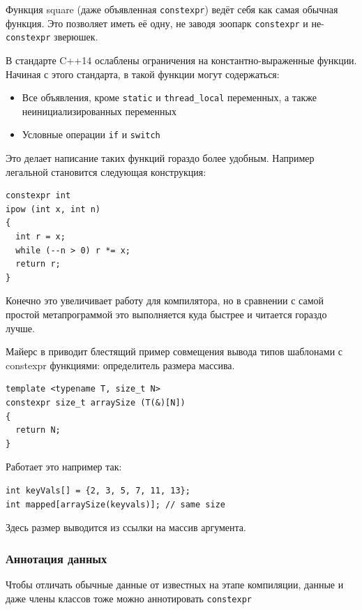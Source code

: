 \documentclass[a4paper,12pt,oneside]{article}
\begin{document}
Функция square (даже объявленная \lstinline!constexpr!) ведёт себя как самая обычная функция. Это позволяет иметь её одну, не заводя зоопарк \lstinline!constexpr! и не-\lstinline!constexpr! зверюшек.

В стандарте C++14 ослаблены ограничения на константно-выраженные функции. Начиная с этого стандарта, в такой функции могут содержаться:

\begin{itemize}
\item Все объявления, кроме \lstinline!static! и \lstinline!thread_local! переменных, а также неинициализированных переменных
\item Условные операции \lstinline!if! и \lstinline!switch!
\end{itemize}

Это делает написание таких функций гораздо более удобным. Например легальной становится следующая конструкция:

\begin{lstlisting}
constexpr int 
ipow (int x, int n) 
{ 
  int r = x;
  while (--n > 0) r *= x;
  return r;
}
\end{lstlisting}

Конечно это увеличивает работу для компилятора, но в сравнении с самой простой метапрограммой это выполняется куда быстрее и читается гораздо лучше.

Майерс в \cite{effmoderncpp} приводит блестящий пример совмещения вывода типов шаблонами с constexpr функциями: определитель размера массива.

\begin{lstlisting}
template <typename T, size_t N>
constexpr size_t arraySize (T(&)[N]) 
{
  return N;
}
\end{lstlisting}

Работает это например так:

\begin{lstlisting}
int keyVals[] = {2, 3, 5, 7, 11, 13};
int mapped[arraySize(keyvals)]; // same size
\end{lstlisting}

Здесь размер выводится из ссылки на массив аргумента.

\subsubsection{Аннотация данных}\label{Constexpr:data}

Чтобы отличать обычные данные от известных на этапе компиляции, данные и даже члены классов тоже можно аннотировать \lstinline!constexpr!
\end{document}
